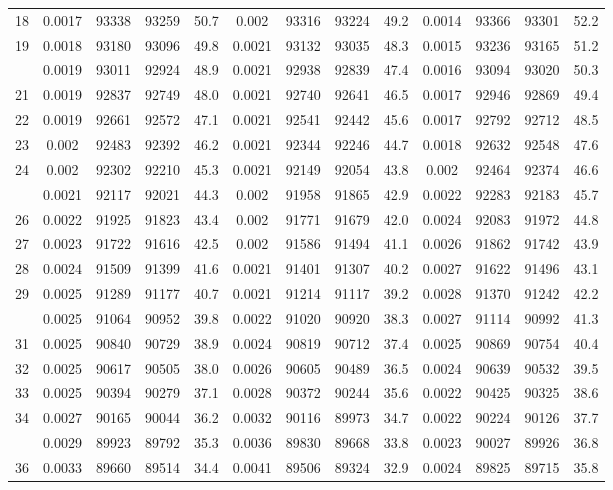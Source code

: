 \documentclass[
  14pt,
]{article}
\begin{document}
\begin{longtable}[t]{lcccccccccccc}
18 & 0.0017 & 93338 & 93259 & 50.7 & 0.002 & 93316 & 93224 & 49.2 & 0.0014 & 93366 & 93301 & 52.2\\
19 & 0.0018 & 93180 & 93096 & 49.8 & 0.0021 & 93132 & 93035 & 48.3 & 0.0015 & 93236 & 93165 & 51.2\\
\addlinespace
20 & 0.0019 & 93011 & 92924 & 48.9 & 0.0021 & 92938 & 92839 & 47.4 & 0.0016 & 93094 & 93020 & 50.3\\
21 & 0.0019 & 92837 & 92749 & 48.0 & 0.0021 & 92740 & 92641 & 46.5 & 0.0017 & 92946 & 92869 & 49.4\\
22 & 0.0019 & 92661 & 92572 & 47.1 & 0.0021 & 92541 & 92442 & 45.6 & 0.0017 & 92792 & 92712 & 48.5\\
23 & 0.002 & 92483 & 92392 & 46.2 & 0.0021 & 92344 & 92246 & 44.7 & 0.0018 & 92632 & 92548 & 47.6\\
24 & 0.002 & 92302 & 92210 & 45.3 & 0.0021 & 92149 & 92054 & 43.8 & 0.002 & 92464 & 92374 & 46.6\\
\addlinespace
25 & 0.0021 & 92117 & 92021 & 44.3 & 0.002 & 91958 & 91865 & 42.9 & 0.0022 & 92283 & 92183 & 45.7\\
26 & 0.0022 & 91925 & 91823 & 43.4 & 0.002 & 91771 & 91679 & 42.0 & 0.0024 & 92083 & 91972 & 44.8\\
27 & 0.0023 & 91722 & 91616 & 42.5 & 0.002 & 91586 & 91494 & 41.1 & 0.0026 & 91862 & 91742 & 43.9\\
28 & 0.0024 & 91509 & 91399 & 41.6 & 0.0021 & 91401 & 91307 & 40.2 & 0.0027 & 91622 & 91496 & 43.1\\
29 & 0.0025 & 91289 & 91177 & 40.7 & 0.0021 & 91214 & 91117 & 39.2 & 0.0028 & 91370 & 91242 & 42.2\\
\addlinespace
30 & 0.0025 & 91064 & 90952 & 39.8 & 0.0022 & 91020 & 90920 & 38.3 & 0.0027 & 91114 & 90992 & 41.3\\
31 & 0.0025 & 90840 & 90729 & 38.9 & 0.0024 & 90819 & 90712 & 37.4 & 0.0025 & 90869 & 90754 & 40.4\\
32 & 0.0025 & 90617 & 90505 & 38.0 & 0.0026 & 90605 & 90489 & 36.5 & 0.0024 & 90639 & 90532 & 39.5\\
33 & 0.0025 & 90394 & 90279 & 37.1 & 0.0028 & 90372 & 90244 & 35.6 & 0.0022 & 90425 & 90325 & 38.6\\
34 & 0.0027 & 90165 & 90044 & 36.2 & 0.0032 & 90116 & 89973 & 34.7 & 0.0022 & 90224 & 90126 & 37.7\\
\addlinespace
35 & 0.0029 & 89923 & 89792 & 35.3 & 0.0036 & 89830 & 89668 & 33.8 & 0.0023 & 90027 & 89926 & 36.8\\
36 & 0.0033 & 89660 & 89514 & 34.4 & 0.0041 & 89506 & 89324 & 32.9 & 0.0024 & 89825 & 89715 & 35.8\\

\end{longtable}
\end{document}
